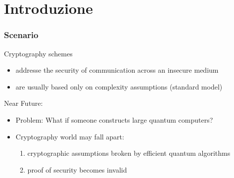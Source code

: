 \section{Introduzione}

\begin{frame}
 \frametitle{Scenario}
 \begin{block}{Cryptography schemes}
 \begin{itemize}
  \item addresse the security of communication across an insecure medium
  \item are usually based only on complexity assumptions (standard model)
 \end{itemize}
 \end{block}
 
 \begin{block}{Near Future:}
 \begin{itemize}
    \item \alert{Problem:} What if someone constructs large quantum computers?
    \item Cryptography world may fall apart:
    \begin{enumerate}
     \item cryptographic assumptions broken by efficient quantum algorithms
     \item proof of security becomes invalid 
    \end{enumerate}
 \end{itemize}
\end{block}

\end{frame}

